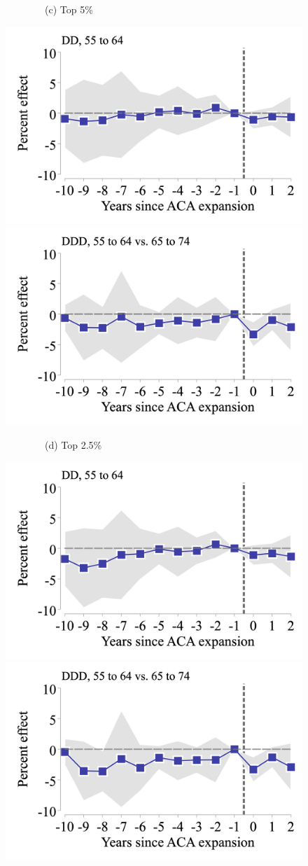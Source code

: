 \documentclass[12pt]{article}%
\begin{document}
\begin{appendices}
\begin{figure}
\begin{minipage}{\linewidth}
\begin{minipage}{.49\linewidth}
        \begin{flushleft}
        ~~~~~~~~(c) Top 5\% \\
        \end{flushleft}
        \centering
        \includegraphics[width=.48\linewidth]{../output/figures/event_study_55_64_ln_amenable_attpop.png}
        \includegraphics[width=.48\linewidth]{../output/figures/event_study_ddd_ln_amenable_attpop.png} 
      \end{minipage}
       \hfill %
      \begin{minipage}{.49\linewidth}
        \begin{flushleft}
        ~~~~~~~~(d) Top 2.5\% \\
        \end{flushleft}
        \centering
        \includegraphics[width=.49\linewidth]{../output/figures/event_study_55_64_ln_amenable_trim_975.png}
        \includegraphics[width=.49\linewidth]{../output/figures/event_study_ddd_ln_amenable_trim_975.png} \\

\end{minipage}
\end{minipage}
\end{figure}
\end{appendices}
\end{document}
